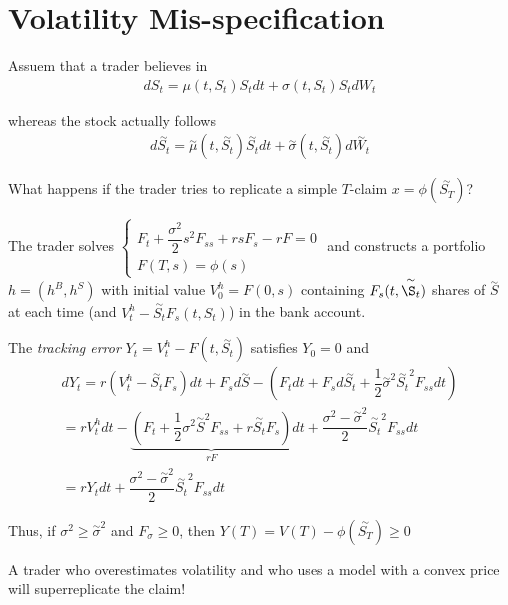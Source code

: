 \section{Volatility Mis-specification}
\noindent Assuem that a trader believes in 
\begin{equation*}
  \begin{gathered}
    dS_t = \mu(t,S_t)S_tdt + \sigma(t,S_t)S_t dW_t
  \end{gathered}
\end{equation*}\par
\noindent whereas the stock actually follows
\begin{equation*}
  \begin{gathered}
    d\stackrel{\sim}{S_t} = \stackrel{\sim}{\mu}(t,\stackrel{\sim}{S_t})\stackrel{\sim}{S_t}dt + \stackrel{\sim}{\sigma}(t,\stackrel{\sim}{S_t})d\stackrel{\sim}{W_t}
  \end{gathered}
\end{equation*}\par
\noindent What happens if the trader tries to replicate a simple $T$-claim $x=\phi(\stackrel{\sim}{S_T})$?\par
\noindent The trader solves $\begin{cases}
  F_t+\dfrac{\sigma^2}{2}s^2F_{ss}+rsF_s-rF=0\\
  F(T,s) = \phi(s)
\end{cases}$ and constructs a portfolio $h = (h^B,h^S)$ with initial value $V_0^h = F(0,s)$ containing $F_s(t,\stackrel{\sim}{\S_t})$ shares of $\stackrel{\sim}{S}$ at each time (and $V_t^h - \stackrel{\sim}{S_t}F_s(t,S_t)$) in the bank account.
\par\bigskip
\noindent The \textit{tracking error} $Y_t = V_t^h-F(t,\stackrel{\sim}{S_t})$ satisfies $Y_0=0$ and
\begin{equation*}
  \begin{gathered}
    dY_t = r(V_t^h-\stackrel{\sim}{S_t}F_s)dt + F_sd\stackrel{\sim}{S}-\left(F_tdt+F_sd\stackrel{\sim}{S_t}+\dfrac{1}{2}\stackrel{\sim}{\sigma}^2\stackrel{\sim}{S_t}^2F_{ss}dt\right)\\
    = rV_t^hdt-\underbrace{\left(F_t+\dfrac{1}{2}\sigma^2\stackrel{\sim}{S}^2F_{ss}+r\stackrel{\sim}{S_t}F_s\right)}_{rF}dt + \dfrac{\sigma^2-\stackrel{\sim}{\sigma}^2}{2}\stackrel{\sim}{S_t}^2F_{ss}dt\\
    = rY_tdt+\dfrac{\sigma^2-\stackrel{\sim}{\sigma}^2}{2}\stackrel{\sim}{S_t}^2F_{ss}dt
  \end{gathered}
\end{equation*}\par
\noindent Thus, if $\sigma^2\geq\stackrel{\sim}{\sigma}^2$ and $F_{\sigma}\geq0$, then $Y(T) = V(T)-\phi(\stackrel{\sim}{S_T})\geq0$
\par\bigskip
\noindent A trader who overestimates volatility and who uses a model with a convex price will superreplicate the claim!
\par\bigskip
